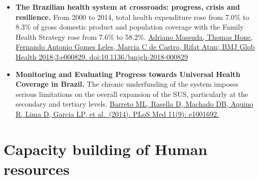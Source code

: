 \documentclass[]{book}
\begin{document}
\begin{itemize}
\item
  \textbf{The Brazilian health system at crossroads: progress, crisis and resilience.} From 2000 to 2014, total health expenditure rose from 7.0\% to 8.3\% of gross domestic product and population coverage with the Family Health Strategy rose from 7.6\% to 58.2\%. \href{https://journals.plos.org/plosmedicine/article/file?id=10.1371/journal.pmed.1001692\&type=printable}{Adriano Massuda, Thomas Hone, Fernando Antonio Gomes Leles, Marcia C de Castro, Rifat Atun; BMJ Glob Health 2018;3:e000829. doi:10.1136/bmjgh-2018-000829}
\item
  \textbf{Monitoring and Evaluating Progress towards Universal Health Coverage in Brazil.} The chronic underfunding of the system imposes serious limitations on the overall expansion of the SUS, particularly at the secondary and tertiary levels. \href{https://journals.plos.org/plosmedicine/article?id=10.1371/journal.pmed.1001692\#}{Barreto ML, Rasella D, Machado DB, Aquino R, Lima D, Garcia LP, et al.~(2014). PLoS Med 11(9): e1001692.}
\end{itemize}

\hypertarget{capacity-building-of-human-resources}{%
\section*{Capacity building of Human resources}\label{capacity-building-of-human-resources}}
\end{document}
